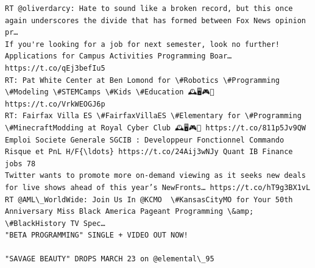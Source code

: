 \documentclass[11pt]{article}
\begin{document}
\begin{Verbatim}[commandchars=\\\{\}]
RT @oliverdarcy: Hate to sound like a broken record, but this once again underscores the divide that has formed between Fox News opinion pr…
If you're looking for a job for next semester, look no further!
Applications for Campus Activities Programming Boar… https://t.co/qEj3befIu5
RT: Pat White Center at Ben Lomond for \#Robotics \#Programming \#Modeling \#STEMCamps \#Kids \#Education 🕰️🖥️🎮💎 https://t.co/VrkWEOGJ6p
RT: Fairfax Villa ES \#FairfaxVillaES \#Elementary for \#Programming \#MinecraftModding at Royal Cyber Club 🕰️🖥️🎮💎 https://t.co/811p5Jv9QW
Emploi Societe Generale SGCIB : Developpeur Fonctionnel Commando Risque et PnL H/F{\ldots} https://t.co/24Aij3wNJy Quant IB Finance jobs 78
Twitter wants to promote more on-demand viewing as it seeks new deals for live shows ahead of this year’s NewFronts… https://t.co/hT9g3BX1vL
RT @AML\_WorldWide: Join Us In @KCMO  \#KansasCityMO for Your 50th Anniversary Miss Black America Pageant Programming \&amp; \#BlackHistory TV Spec…
"BETA PROGRAMMING" SINGLE + VIDEO OUT NOW!

"SAVAGE BEAUTY" DROPS MARCH 23 on @elemental\_95 


\end{Verbatim}
\end{document}
